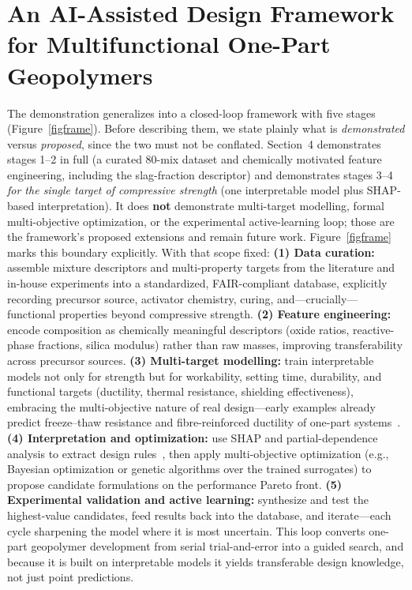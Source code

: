\documentclass[materials,article,submit,pdftex,moreauthors]{Definitions/mdpi}
\begin{document}
\section{An AI-Assisted Design Framework for Multifunctional One-Part Geopolymers}
The demonstration generalizes into a closed-loop framework with five stages (Figure~\ref{figframe}). Before describing them, we state plainly what is \emph{demonstrated} versus \emph{proposed}, since the two must not be conflated. Section~4 demonstrates stages 1--2 in full (a curated 80-mix dataset and chemically motivated feature engineering, including the slag-fraction descriptor) and demonstrates stages 3--4 \emph{for the single target of compressive strength} (one interpretable model plus SHAP-based interpretation). It does \textbf{not} demonstrate multi-target modelling, formal multi-objective optimization, or the experimental active-learning loop; those are the framework's proposed extensions and remain future work. Figure~\ref{figframe} marks this boundary explicitly. With that scope fixed: \textbf{(1) Data curation:} assemble mixture descriptors and multi-property targets from the literature and in-house experiments into a standardized, FAIR-compliant database, explicitly recording precursor source, activator chemistry, curing, and---crucially---functional properties beyond compressive strength. \textbf{(2) Feature engineering:} encode composition as chemically meaningful descriptors (oxide ratios, reactive-phase fractions, silica modulus) rather than raw masses, improving transferability across precursor sources. \textbf{(3) Multi-target modelling:} train interpretable models not only for strength but for workability, setting time, durability, and functional targets (ductility, thermal resistance, shielding effectiveness), embracing the multi-objective nature of real design---early examples already predict freeze--thaw resistance and fibre-reinforced ductility of one-part systems~\cite{ref29,ref32,ref35}. \textbf{(4) Interpretation and optimization:} use SHAP and partial-dependence analysis to extract design rules~\cite{ref38}, then apply multi-objective optimization (e.g., Bayesian optimization or genetic algorithms over the trained surrogates) to propose candidate formulations on the performance Pareto front. \textbf{(5) Experimental validation and active learning:} synthesize and test the highest-value candidates, feed results back into the database, and iterate---each cycle sharpening the model where it is most uncertain. This loop converts one-part geopolymer development from serial trial-and-error into a guided search, and because it is built on interpretable models it yields transferable design knowledge, not just point predictions.
\end{document}
